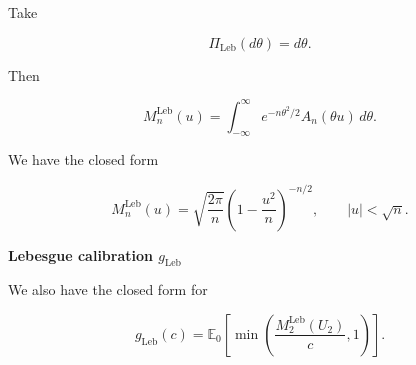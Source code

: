 \documentclass{article}%
\begin{document}
Take

\[
\Pi_{\mathrm{Leb}}(d\theta)=d\theta.
\]

Then

\[
M_n^{\mathrm{Leb}}(u)
=
\int_{-\infty}^\infty e^{-n\theta^2/2}A_n(\theta u)\,d\theta.
\]

We have the closed form

\[
M_n^{\mathrm{Leb}}(u)
=
\sqrt{\frac{2\pi}{n}}
\left(1-\frac{u^2}{n}\right)^{-n/2},
\qquad |u|<\sqrt n.
\]



















\textbf{Lebesgue calibration \(g_{\mathrm{Leb}}\)}

We also have the closed form for

\[
g_{\mathrm{Leb}}(c)
=
\mathbb E_0\!\left[
\min\!\left(\frac{M_2^{\mathrm{Leb}}(U_2)}{c},1\right)
\right].
\]
\end{document}
